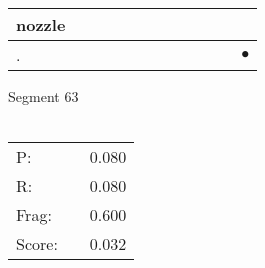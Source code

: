 \documentclass[landscape]{article}
\newcommand{\ssp}{\hspace{2pt}}
\newcommand{\mex}{\cellcolor{g}$\bullet$}
\begin{document}
\begin{tabular}{|l|p{10pt}|p{10pt}|p{10pt}|p{10pt}|p{10pt}|p{10pt}|p{10pt}|p{10pt}|p{10pt}|p{10pt}|p{10pt}|}
\hline
\ssp nozzle \ssp&\hspace{2pt}&\hspace{2pt}&\hspace{2pt}&\hspace{2pt}&\hspace{2pt}&\hspace{2pt}&\hspace{2pt}&\hspace{2pt}&\hspace{2pt}&\hspace{2pt}&\hspace{2pt}\\
\hline
\ssp \cellcolor{ref10}. \ssp&\hspace{2pt}&\hspace{2pt}&\hspace{2pt}&\hspace{2pt}&\hspace{2pt}&\hspace{2pt}&\hspace{2pt}&\hspace{2pt}&\hspace{2pt}&\hspace{2pt}&\hspace{2pt}\mex\\
\hline
\end{tabular}

\vspace{6pt}
\noindent Segment 63\\\\
\noindent\begin{tabular}{lm{12pt}r}
\hline
P:&&0.080\\
R:&&0.080\\
Frag:&&0.600\\
Score:&&0.032\\
\end{tabular}

\newpage
\end{document}
